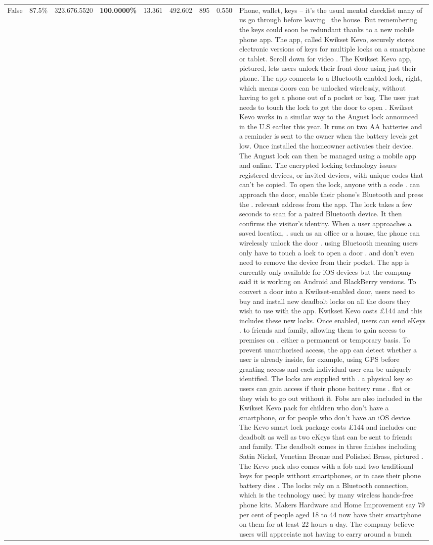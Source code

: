 \begin{table}[H]
\begin{tabular}{lllrlllll}
False & 87.5\% & 323,676.5520 & \bfseries \color{red} 100.0000\% & 13.361 & 492.602 & 895 & 0.550 & Phone, wallet, keys – it’s the usual mental checklist many of us go through before leaving  the house. But remembering the keys could soon be redundant thanks to a new mobile phone app. The app, called Kwikset Kevo, securely stores electronic versions of keys for multiple locks on a smartphone or tablet. Scroll down for video . The Kwikset Kevo app, pictured, lets users unlock their front door using just their phone. The app connects to a Bluetooth enabled lock, right, which means doors can be unlocked wirelessly, without having to get a phone out of a pocket or bag. The user just needs to touch the lock to get the door to open . Kwikset Kevo works in a similar way to the August lock announced in the U.S earlier this year. It runs on two AA batteries and a reminder is sent to the owner when the battery levels get low. Once installed the homeowner activates their device. The August lock can then be managed using a mobile app and online. The encrypted locking technology issues registered devices, or invited devices, with unique codes that can't be copied. To open the lock, anyone with a code . can approach the door, enable their phone's Bluetooth and press the . relevant address from the app. The lock takes a few seconds to scan for a paired Bluetooth device. It then confirms the visitor's identity. When a user approaches a saved location, . such as an office or a house, the phone can wirelessly unlock the door . using Bluetooth meaning users only have to touch a lock to open a door . and don't even need to remove the device from their pocket. The app is currently only available for iOS devices but the company said it is working on Android and BlackBerry versions. To convert a door into a Kwikset-enabled door, users need to buy and install new deadbolt locks on all the doors they wish to use with the app. Kwikset Kevo costs £144 and this includes these new locks. Once enabled, users can send eKeys . to friends and family, allowing them to gain access to premises on . either a permanent or temporary basis. To prevent unauthorised access, the app can detect whether a user is already inside, for example, using GPS before granting access and each individual user can be uniquely identified. The locks are supplied with . a physical key so users can gain access if their phone battery runs . flat or they wish to go out without it. Fobs are also included in the Kwikset Kevo pack for children who don't have a smartphone, or for people who don't have an iOS device. The Kevo smart lock package costs £144 and includes one deadbolt as well as two eKeys that can be sent to friends and family. The deadbolt comes in three finishes including Satin Nickel, Venetian Bronze and Polished Brass, pictured . The Kevo pack also comes with a fob and two traditional keys for people without smartphones, or in case their phone battery dies . The locks rely on a Bluetooth connection, which is the technology used by many wireless hands-free phone kits. Makers Hardware and Home Improvement say 79 per cent of people aged 18 to 44 now have their smartphone on them for at least 22 hours a day. The company believe users will appreciate not having to carry around a bunch 
\end{tabular}
\end{table}
